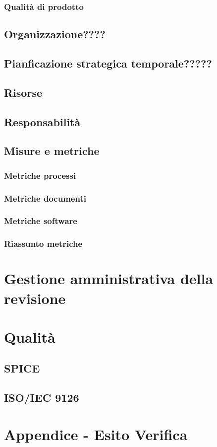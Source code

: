 \documentclass[a4paper, oneside, openany, dvipsnames, table]{article}
\begin{document}
		\subsubsection{Qualità di prodotto}
			
	\subsection{Organizzazione????}
		\subsection{Pianficazione strategica temporale?????}
	\subsection{Risorse}
	\subsection{Responsabilità}
	\subsection{Misure e metriche}
	\label{sec:metriche}
		
		\subsubsection{Metriche processi}
			
		\subsubsection{Metriche documenti}
			
		\subsubsection{Metriche software}
			
		\subsubsection{Riassunto metriche}
			
\newpage
\section{Gestione amministrativa della revisione}


\appendix
{}
\newpage
\section{Qualità}
	\subsection{SPICE}
		\label{app:SPICE}
		
	\subsection{ISO/IEC 9126}
		\label{app:ISO/IEC 9126}
		
\newpage
\section{Appendice - Esito Verifica}
	\label{app:misure}
\end{document}

